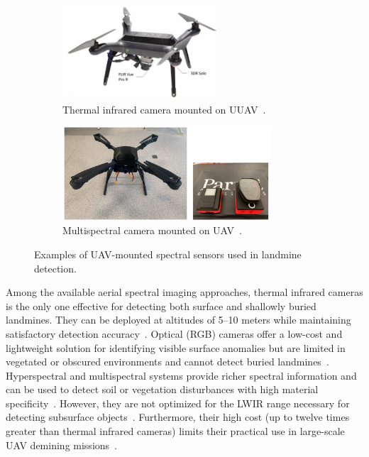 \begin{figure}[h!]
    \centering
    \begin{subfigure}[b]{0.48\linewidth}
        \centering
        \includegraphics[height=3.5cm]{figs/Huirui/thermal_camera_drone.png}
        \caption{Thermal infrared camera mounted on U\gls{UAV}~\cite{nikulin2018detection}.}
        \label{fig:thermal_camera_drone}
    \end{subfigure}
    \hfill
    \begin{subfigure}[b]{0.48\linewidth}
        \centering
        \includegraphics[height=3.5cm]{figs/Huirui/multispectral_drone.png}
        \caption{Multispectral camera mounted on \gls{UAV}~\cite{qiu2023joint}.}
        \label{fig:optical_camera_drone}
    \end{subfigure}
    \caption{Examples of \gls{UAV}-mounted spectral sensors used in landmine detection.}
    \label{fig:spectral_camera_drones}
\end{figure}

Among the available aerial spectral imaging approaches, thermal infrared cameras is the only one effective for detecting both surface and shallowly buried landmines. They can be deployed at altitudes of 5--10 meters while maintaining satisfactory detection accuracy~\cite{TENORIOTAMAYO2024105567,rs15040967}. Optical (RGB) cameras offer a low-cost and lightweight solution for identifying visible surface anomalies but are limited in vegetated or obscured environments and cannot detect buried landmines~\cite{Baur2021HowTI,6842242,rs16122046}. Hyperspectral and multispectral systems provide richer spectral information and can be used to detect soil or vegetation disturbances with high material specificity~\cite{10765909}. However, they are not optimized for the \gls{LWIR} range necessary for detecting subsurface objects~\cite{ptsa-qj43-23}. Furthermore, their high cost (up to twelve times greater than thermal infrared cameras) limits their practical use in large-scale \gls{UAV} demining missions~\cite{rs15040967}.




